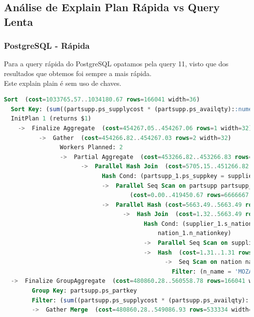 \documentclass{article}
\begin{document}
\clearpage
\subsection{Análise de Explain Plan Rápida vs Query Lenta}
\subsubsection{PostgreSQL - Rápida}
\texttt{}\par Para a query rápida do PostgreSQL opatamos pela query 11, visto que dos resultados que obtemos foi sempre a mais rápida.\\

Este explain plain é sem uso de chaves.

\begin{lstlisting}[language=SQL]
Sort  (cost=1033765.57..1034180.67 rows=166041 width=36)
  Sort Key: (sum((partsupp.ps_supplycost * (partsupp.ps_availqty)::numeric))) DESC
  InitPlan 1 (returns $1)
    ->  Finalize Aggregate  (cost=454267.05..454267.06 rows=1 width=32)
          ->  Gather  (cost=454266.82..454267.03 rows=2 width=32)
                Workers Planned: 2
                ->  Partial Aggregate  (cost=453266.82..453266.83 rows=1 width=32)
                      ->  Parallel Hash Join  (cost=5705.15..451266.82 rows=266667 width=10)
                            Hash Cond: (partsupp_1.ps_suppkey = supplier_1.s_suppkey)
                            ->  Parallel Seq Scan on partsupp partsupp_1  
                                    (cost=0.00..419450.67 rows=6666667 width=14)
                            ->  Parallel Hash (cost=5663.49..5663.49 rows=3333 width=4)
                                  ->  Hash Join  (cost=1.32..5663.49 rows=3333 width=4)
                                        Hash Cond: (supplier_1.s_nationkey = 
                                            nation_1.n_nationkey)
                                        ->  Parallel Seq Scan on supplier supplier_1  (cost=0.00..5316.33 rows=83333 width=8)
                                        ->  Hash  (cost=1.31..1.31 rows=1 width=4)
                                              ->  Seq Scan on nation nation_1  (cost=0.00..1.31 rows=1 width=4)
                                                Filter: (n_name = 'MOZAMBIQUE'::bpchar)
  ->  Finalize GroupAggregate  (cost=480860.28..560558.78 rows=166041 width=36)
        Group Key: partsupp.ps_partkey
        Filter: (sum((partsupp.ps_supplycost * (partsupp.ps_availqty)::numeric)) > $1)
        ->  Gather Merge  (cost=480860.28..549086.93 rows=533334 width=36)

\end{lstlisting}
\end{document}
